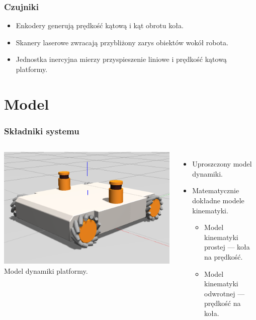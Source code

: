 \documentclass{beamer}
\begin{document}
	\begin{frame}
		\frametitle{Czujniki}
		\begin{itemize}
			\item Enkodery generują prędkość kątową i kąt obrotu koła.
			\item Skanery laserowe zwracają przybliżony zarys obiektów wokół robota.
			\item Jednostka inercyjna mierzy przyspieszenie liniowe i prędkość kątową platformy.
		\end{itemize}
	\end{frame}
	
	
	
	\section{Model}
	\begin{frame}
		\frametitle{Składniki systemu}
		\begin{columns}[c]
				\centering
				\includegraphics[width=\textwidth]{graphics/model.png} \\
				Model dynamiki platformy.
				\begin{itemize}
					\item Uproszczony model dynamiki.
					\item Matematycznie dokładne modele kinematyki.
					\begin{itemize}
						\item Model kinematyki prostej --- koła na prędkość.
						\item Model kinematyki odwrotnej --- prędkość na koła.
					\end{itemize}

\end{itemize}
\end{columns}
\end{frame}
\end{document}
